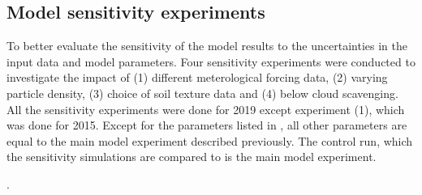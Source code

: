 \subsection{Model sensitivity experiments}
To better evaluate the sensitivity of the model results to the uncertainties in the input data and model parameters. Four sensitivity experiments were conducted to investigate the impact of (1) different meterological forcing data, (2) varying particle density, (3) choice of soil texture data and (4) below cloud scavenging. All the sensitivity experiments were done for 2019 except experiment (1), which was done for 2015. Except for the parameters listed in , all other parameters are equal to the main model experiment described previously. The control run, which the sensitivity simulations are compared to is the main model experiment. 

\begin{table}[htpb]\label{tab:sensitivity_exp}
\caption{The model sensitivity experiments performed in this study}.
\centering

\end{table}




